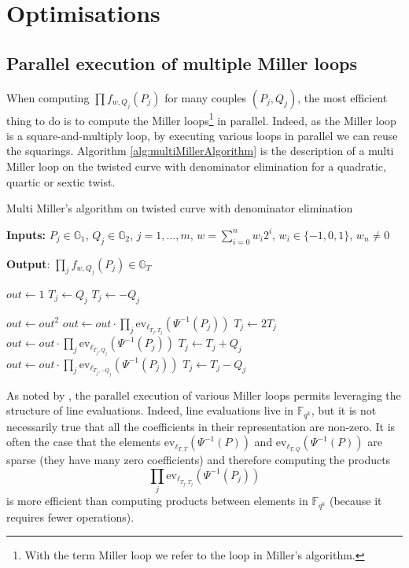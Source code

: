 \documentclass{article}
\newcommand{\gOne}{\mathbb{G}_1}
\newcommand{\gTwo}{\mathbb{G}_2}
\newcommand{\gT}{\mathbb{G}_T}
\newcommand{\ev}{\mathrm{ev}}
\newcommand{\fq}[1]{\mathbb{F}_{q^{#1}}}
\theoremstyle{remark}
\theoremstyle{plain}
\begin{document}
\section{Optimisations}

\subsection{Parallel execution of multiple Miller loops}

When computing $\prod f_{w,Q_j}(P_j)$ for many couples $(P_j,Q_j)$, the most efficient thing to do is to compute the Miller loops\footnote{With the term Miller loop we refer to the loop in Miller's algorithm.} in parallel.
Indeed, as the Miller loop is a square-and-multiply loop, by executing various loops in parallel we can reuse the squarings.
Algorithm \ref{alg:multiMillerAlgorithm} is the description of a multi Miller loop on the twisted curve with denominator elimination for a quadratic, quartic or sextic twist.

\begin{algorithm}
    \caption{\small Multi Miller's algorithm on twisted curve with denominator elimination}\label{alg:multiMillerAlgorithm}
    \textbf{Inputs:} $P_j \in \gOne$, $Q_j \in \gTwo$, $j=1, \dots, m$, $w = \sum_{i=0}^n w_i 2^i$, $w_i \in \{-1,0,1\}$, $w_n \neq 0$

    \textbf{Output}: $\prod_j f_{w,Q_j}(P_j) \in \gT$
    \begin{algorithmic}
        \State $out \gets 1$
            \State $T_j \gets Q_j$
        \Else
            \State $T_j \gets -Q_j$
        \EndIf

        \State $out \gets out^2$
        \State $out \gets out \cdot \prod_j \ev_{\ell_{T_j,T_j}}(\Psi^{-1}(P_j))$
        \State $T_j \gets 2T_j$
            \State $out \gets out \cdot \prod_j \ev_{\ell_{T_j,Q_j}}(\Psi^{-1}(P_j))$
            \State $T_j \gets T_j+ Q_j$
        \Else
            \State $out \gets out \cdot \prod_j \ev_{\ell_{T_j,-Q_j}}(\Psi^{-1}(P_j))$
            \State $T_j \gets T_j - Q_j$
        \EndIf
        \EndFor
    \end{algorithmic}
\end{algorithm}

As noted by \cite{S-pairing-impl-revisited}, the parallel execution of various Miller loops permits leveraging the structure of line evaluations.
Indeed, line evaluations live in $\fq{k}$, but it is not necessarily true that all the coefficients in their representation are non-zero.
It is often the case that the elements $\ev_{\ell_{T,T}}(\Psi^{-1}(P))$ and $\ev_{\ell_{T,Q}}(\Psi^{-1}(P))$ are sparse (they have many zero coefficients) and therefore computing the products
\[
    \prod_j \ev_{\ell_{T_j,T_j}}(\Psi^{-1}(P_j))
\]
is more efficient than computing products between elements in $\fq{k}$ (because it requires fewer operations).
\end{document}

